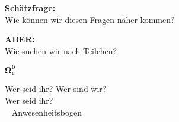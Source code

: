 \begin{frame} \Large
    \begin{center}
     \textcolor{LHCbDarkBlue}{\textbf{Schätzfrage:} }\\  \vspace{1cm}
     Wie können wir diesen Fragen näher kommen?
    \end{center}\pause 
    \begin{center}  \vspace{1cm}
    \end{center}
\end{frame}

\begin{frame} \Large
    \begin{center}
     \textcolor{LHCbDarkBlue}{\textbf{ABER:} }\\  \vspace{1cm}
     Wie suchen wir nach Teilchen?
    \end{center}\pause 
    \begin{center}  \vspace{1cm}
    \end{center}
\end{frame}
\begin{frame} \Huge\Huge
    \begin{center}
     \textcolor{LHCbDarkBlue}{$\mathbf{\Omega_c^0}$ }\\  \vspace{1cm}
 \end{center}
\end{frame}


\GroupPresentation \addtocounter{framenumber}{1}



\begin{frame}{Wer seid ihr?}
\Large Wer sind wir?  \\ \vspace{1cm}
    \Large Wer seid ihr? \\ \pause
    \large ~  Anwesenheitsbogen
\end{frame}

